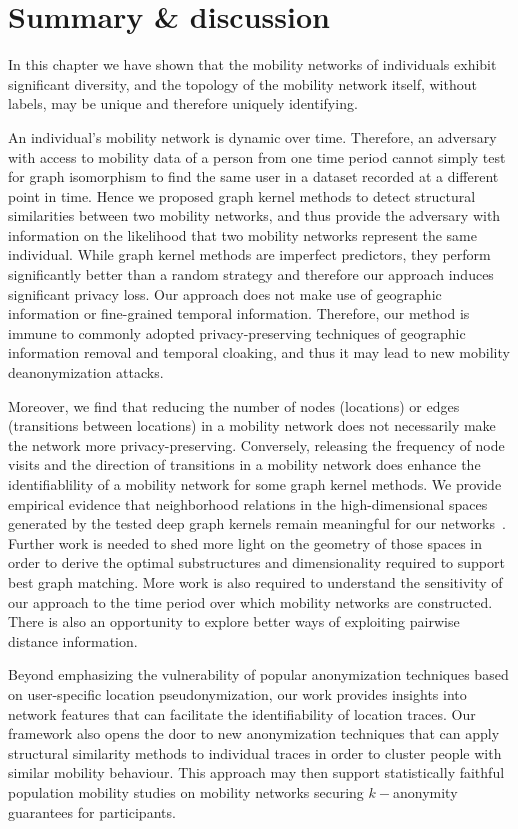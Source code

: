 \section{Summary \& discussion} %

In this chapter we have shown that the mobility networks of individuals exhibit significant diversity, and the topology of the mobility network itself, without labels, may be unique and therefore uniquely identifying.

An individual's mobility network is dynamic over time.
Therefore, an adversary with access to mobility data of a person from one time period cannot simply test for graph isomorphism to find the same user in a dataset recorded at a different point in time.
Hence we proposed graph kernel methods to detect structural similarities between two mobility networks, and thus provide the adversary with information on the likelihood that two mobility networks represent the same individual.
While graph kernel methods are imperfect predictors, they perform significantly better than a random strategy and therefore our approach induces significant privacy loss.
Our approach does not make use of geographic information or fine-grained temporal information. Therefore, our method is immune to commonly adopted privacy-preserving techniques of geographic information removal and temporal cloaking, and thus it may lead to new mobility deanonymization attacks.

Moreover, we find that reducing the number of nodes (locations) or edges (transitions between locations) in a mobility network does not necessarily make the network more privacy-preserving.
Conversely, releasing the frequency of node visits and the direction of transitions in a mobility network does enhance the identifiablility of a mobility network for some graph kernel methods.
We provide empirical evidence that neighborhood relations in the high-dimensional spaces generated by the tested deep graph kernels remain meaningful for our networks~\cite{Beyer}.
Further work is needed to shed more light on the geometry of those spaces in order to derive the optimal substructures and dimensionality required to support best graph matching.
More work is also required to understand the sensitivity of our approach to the time period over which mobility networks are constructed.
There is also an opportunity to explore better ways of exploiting pairwise distance information.

Beyond emphasizing the vulnerability of popular anonymization techniques based on user-specific location pseudonymization, our work provides insights into network features that can facilitate the identifiability of location traces.
Our framework also opens the door to new anonymization techniques that can apply structural similarity methods to individual traces in order to cluster people with similar mobility behaviour.
This approach may then support statistically faithful population mobility studies on mobility networks securing $k-$anonymity guarantees for participants.

